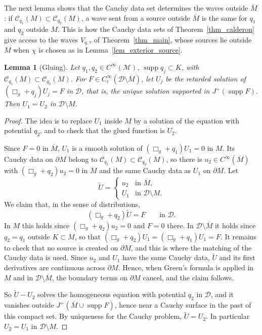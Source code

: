 \documentclass[12pt,reqno]{amsart}
\numberwithin{equation}{section}
\theoremstyle{definition}
\theoremstyle{plain}
\newtheorem{lemma}[theorem]{Lemma}
\theoremstyle{definition}
\theoremstyle{definition}
\newcommand{\M}{\mathcal{M}}
\newcommand{\D}{\mathcal{D}}
\newcommand{\uu}{M}
\DeclareMathOperator{\supp}{supp}
\begin{document}
The next lemma shows that the Cauchy data set determines the waves outside $\overline\uu$: if $\mathcal C_{q_1}(\uu)\subset\mathcal C_{q_2}(\uu)$, a wave sent from a source outside $\overline\uu$ is the same for $q_1$ and $q_2$ outside $\uu$. This is how the Cauchy data sets of Theorem~\ref{thm_calderon} give access to the waves $V_{q,\tau}$ of Theorem~\ref{thm_main}, whose sources lie outside $\overline\uu$ when $\chi$ is chosen as in Lemma~\ref{lem_exterior_source}.

\begin{lemma}[Gluing]\label{lem_gluing}
Let $q_1,q_2\in C^\infty(\M)$, $\supp q_j\subset K$, with $\mathcal C_{q_1}(\uu)\subset\mathcal C_{q_2}(\uu)$. For $F\in C^\infty_c(\D\setminus\overline\uu)$, let $U_j$ be the retarded solution of $(\Box_g+q_j)U_j=F$ in $\D$, that is, the unique solution supported in $J^+(\supp F)$. Then $U_1=U_2$ in $\D\setminus\uu$.
\end{lemma}
\begin{proof}
The idea is to replace $U_1$ inside $\uu$ by a solution of the equation with potential $q_2$, and to check that the glued function is $U_2$.

Since $F=0$ in $\overline\uu$, $U_1$ is a smooth solution of $(\Box_g+q_1)U_1=0$ in $\uu$. Its Cauchy data on $\partial\uu$ belong to $\mathcal C_{q_1}(\uu)\subset\mathcal C_{q_2}(\uu)$, so there is $u_2\in C^\infty(\overline\uu)$ with $(\Box_g+q_2)u_2=0$ in $\uu$ and the same Cauchy data as $U_1$ on $\partial\uu$. Let
\[
\tilde U=\begin{cases}u_2&\text{in }\overline\uu,\\ U_1&\text{in }\D\setminus\uu.\end{cases}
\]
We claim that, in the sense of distributions,
\[
(\Box_g+q_2)\tilde U=F\qquad\text{in }\D .
\]
In $\uu$ this holds since $(\Box_g+q_2)u_2=0$ and $F=0$ there. In $\D\setminus\overline\uu$ it holds since $q_2=q_1$ outside $K\subset\uu$, so that $(\Box_g+q_2)U_1=(\Box_g+q_1)U_1=F$. It remains to check that no source is created on $\partial\uu$, and this is where the matching of the Cauchy data is used. Since $u_2$ and $U_1$ have the same Cauchy data, $\tilde U$ and its first derivatives are continuous across $\partial\uu$. Hence, when Green's formula is applied in $\uu$ and in $\D\setminus\overline\uu$, the boundary terms on $\partial\uu$ cancel, and the claim follows.

So $\tilde U-U_2$ solves the homogeneous equation with potential $q_2$ in $\D$, and it vanishes outside $J^+(\overline\uu\cup\supp F)$, hence near a Cauchy surface in the past of this compact set. By uniqueness for the Cauchy problem, $\tilde U=U_2$. In particular $U_2=U_1$ in $\D\setminus\uu$.
\end{proof}
\end{document}
